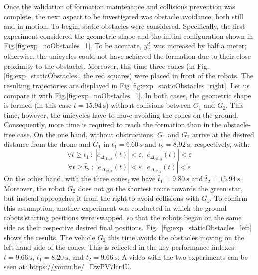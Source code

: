 \documentclass{ifacconf}
\begin{document}
Once the validation of formation maintenance and collisions 
prevention was complete, the next aspect to be investigated 
was obstacle avoidance, both still and in motion.
To begin, static obstacles were considered.
Specifically, the first experiment considered the geometric 
shape and the initial configuration shown in Fig.\ref{fig:exp_noObstacles_1}.
To be accurate, $y^d_A$ was increased by half a meter; otherwise, 
the unicycles could not have achieved the formation 
due to their close proximity to the obstacles.
Moreover, this time three cones (in Fig.\ref{fig:exp_staticObstacles}, the red squares)
were placed in front of the robots.
The resulting trajectories are displayed in Fig.\ref{fig:exp_staticObstacles_right}.
Let us compare it with Fig.\ref{fig:exp_noObstacles_1}.
In both cases, the geometric shape is formed (in this case $\bar{t} = \SI{15.94}{\second}$)
without collisions between $G_1$ and $G_2$.
This time, however, the unicycles have to move avoiding the cones on the ground.
Consequently, more time is required to reach the formation than 
in the obstacle-free case.
On the one hand, without obstructions, $G_1$ and $G_2$ arrive at the desired distance 
from the drone and $G_1$ in $\bar{t}_1 = \SI{6.60}{\second}$ 
and $\bar{t}_2 = \SI{8.92}{\second}$, respectively, with:
\begin{equation}
    \forall t \geq \bar{t}_1 \ : \ \left\lvert e_{\Delta_{A1,x}}(t) \right\rvert < \varepsilon , \left\lvert e_{\Delta_{A1,y}}(t)\right\rvert < \varepsilon 
\end{equation}
\begin{equation}
    \forall t \geq \bar{t}_2 \ : \ \left\lvert e_{\Delta_{12,x}}(t) \right\rvert < \varepsilon , \left\lvert e_{\Delta_{12,y}}(t) \right\rvert < \varepsilon
\end{equation}
On the other hand, with the three cones, we have 
$\bar{t}_1 = \SI{9.80}{\second}$ 
and $\bar{t}_2 = \SI{15.94}{\second}$.
Moreover, the robot $G_2$ does not go the shortest route towards 
the green star, but instead approaches it from the right to avoid 
collisions with $G_1$.
To confirm this assumption, another experiment was conducted in which the ground 
robots'starting positions were swapped, so that the robots began on the same side 
as their respective desired final positions.
Fig.~\ref{fig:exp_staticObstacles_left} shows the results.
The vehicle $G_2$ this time avoids the obstacles moving on 
the left-hand side of the cones.
This is reflected in the key performance indexes:
$\bar{t} = \SI{9.66}{\second}$,
$\bar{t}_1 = \SI{8.20}{\second}$, and $\bar{t}_2 = \SI{9.66}{\second}$.
A video with the two experiments can be seen at:
\textcolor{blue}{\href{https://youtu.be/_DwPV7lcr4U}
{https://youtu.be/\_DwPV7lcr4U}}.
\end{document}
